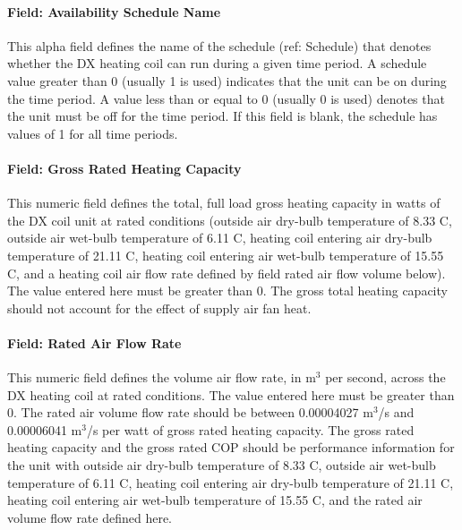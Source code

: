\paragraph{Field: Availability Schedule Name}\label{field-availability-schedule-name-2-004}

This alpha field defines the name of the schedule (ref: Schedule) that denotes whether the DX heating coil can run during a given time period. A schedule value greater than 0 (usually 1 is used) indicates that the unit can be on during the time period. A value less than or equal to 0 (usually 0 is used) denotes that the unit must be off for the time period. If this field is blank, the schedule has values of 1 for all time periods.

\paragraph{Field: Gross Rated Heating Capacity}\label{field-gross-rated-heating-capacity-1}

This numeric field defines the total, full load gross heating capacity in watts of the DX coil unit at rated conditions (outside air dry-bulb temperature of 8.33 C, outside air wet-bulb temperature of 6.11 C, heating coil entering air dry-bulb temperature of 21.11 C, heating coil entering air wet-bulb temperature of 15.55 C, and a heating coil air flow rate defined by field rated air flow volume below). The value entered here must be greater than 0. The gross total heating capacity should not account for the effect of supply air fan heat.

\paragraph{Field: Rated Air Flow Rate}\label{field-rated-air-flow-rate-1}

This numeric field defines the volume air flow rate, in m\(^{3}\) per second, across the DX heating coil at rated conditions. The value entered here must be greater than 0. The rated air volume flow rate should be between 0.00004027 m\(^{3}\)/s and 0.00006041 m\(^{3}\)/s per watt of gross rated heating capacity. The gross rated heating capacity and the gross rated COP should be performance information for the unit with outside air dry-bulb temperature of 8.33 C, outside air wet-bulb temperature of 6.11 C, heating coil entering air dry-bulb temperature of 21.11 C, heating coil entering air wet-bulb temperature of 15.55 C, and the rated air volume flow rate defined here.

